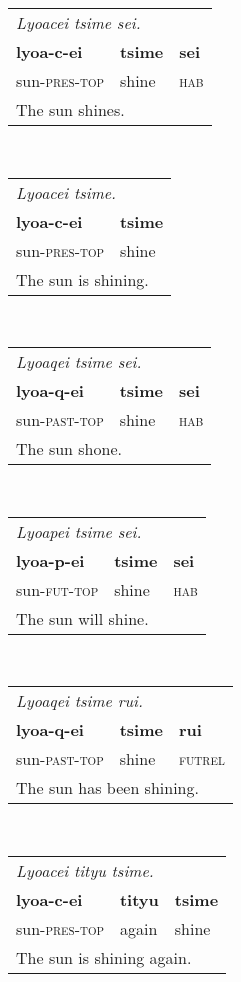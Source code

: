 \documentclass{article}
\begin{document}
\begin{tabular}{l l l}
\multicolumn{3}{l}{\emph{Lyoacei tsime sei.}} \\
\textbf{lyoa-c-ei} & \textbf{tsime} & \textbf{sei} \\
sun-\textsc{pres}-\textsc{top} & shine & \textsc{hab} \\
\multicolumn{3}{l}{The sun shines.} \\
\end{tabular}
\\[0.5cm]
\begin{tabular}{l l}
\multicolumn{2}{l}{\emph{Lyoacei tsime.}} \\
\textbf{lyoa-c-ei} & \textbf{tsime} \\
sun-\textsc{pres-top} & shine \\
\multicolumn{2}{l}{The sun is shining.} \\
\end{tabular}
\\[0.5cm]
\begin{tabular}{l l l}
\multicolumn{3}{l}{\emph{Lyoaqei tsime sei.}} \\
\textbf{lyoa-q-ei} & \textbf{tsime} & \textbf{sei} \\
sun-\textsc{past-top} & shine & \textsc{hab} \\
\multicolumn{3}{l}{The sun shone.} \\
\end{tabular}
\\[0.5cm]
\begin{tabular}{l l l}
\multicolumn{3}{l}{\emph{Lyoapei tsime sei.}} \\
\textbf{lyoa-p-ei} & \textbf{tsime} & \textbf{sei} \\
sun-\textsc{fut-top} & shine & \textsc{hab} \\
\multicolumn{3}{l}{The sun will shine.} \\
\end{tabular}
\\[0.5cm]
\begin{tabular}{l l l}
\multicolumn{3}{l}{\emph{Lyoaqei tsime rui.}} \\
\textbf{lyoa-q-ei} & \textbf{tsime} & \textbf{rui} \\
sun-\textsc{past-top} & shine & \textsc{futrel} \\
\multicolumn{3}{l}{The sun has been shining.} \\
\end{tabular}
\\[0.5cm]
\begin{tabular}{l l l}
\multicolumn{3}{l}{\emph{Lyoacei tityu tsime.}} \\
\textbf{lyoa-c-ei} & \textbf{tityu} & \textbf{tsime} \\
sun-\textsc{pres-top} & again & shine \\
\multicolumn{3}{l}{The sun is shining again.} \\
\end{tabular}
\end{document}
